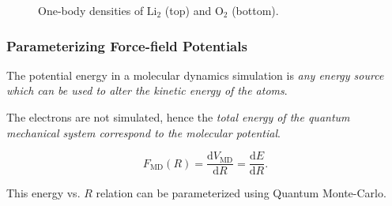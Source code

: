 \begin{frame}
\begin{figure}[h]
\begin{center}
  \caption{One-body densities of $\mathrm{Li_2}$ (top) and $\mathrm{O_2}$ (bottom). }
  \label{fig:OBD_Molecules}
 \end{center}
\end{figure}
\end{frame}

\begin{frame}
 \frametitle{Parameterizing Force-field Potentials}

The potential energy in a molecular dynamics simulation is \emph{any energy source which can be used to alter the kinetic energy of the atoms}.
\shift

The electrons are not simulated, hence the \emph{total energy of the quantum mechanical system correspond to the molecular potential}.

\begin{equation}
 F_\mathrm{MD}(R) = \frac{\mathrm{d} V_\mathrm{MD}}{\mathrm{d} R} = \frac{\mathrm{d} E}{\mathrm{d} R}.
\end{equation}
\shift

This energy vs. $R$ relation can be parameterized using Quantum Monte-Carlo.


\end{frame}

